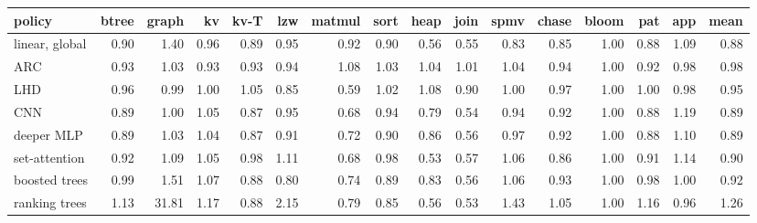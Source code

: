 \begin{tabular}{lrrrrrrrrrrrrrrr}
\toprule
policy & btree & graph & kv & kv-T & lzw & matmul & sort & heap & join & spmv & chase & bloom & pat & app & mean \\
\midrule
linear, global & 0.90 & 1.40 & 0.96 & 0.89 & 0.95 & 0.92 & 0.90 & 0.56 & 0.55 & 0.83 & 0.85 & 1.00 & 0.88 & 1.09 & 0.88 \\
ARC & 0.93 & 1.03 & 0.93 & 0.93 & 0.94 & 1.08 & 1.03 & 1.04 & 1.01 & 1.04 & 0.94 & 1.00 & 0.92 & 0.98 & 0.98 \\
LHD & 0.96 & 0.99 & 1.00 & 1.05 & 0.85 & 0.59 & 1.02 & 1.08 & 0.90 & 1.00 & 0.97 & 1.00 & 1.00 & 0.98 & 0.95 \\
CNN & 0.89 & 1.00 & 1.05 & 0.87 & 0.95 & 0.68 & 0.94 & 0.79 & 0.54 & 0.94 & 0.92 & 1.00 & 0.88 & 1.19 & 0.89 \\
deeper MLP & 0.89 & 1.03 & 1.04 & 0.87 & 0.91 & 0.72 & 0.90 & 0.86 & 0.56 & 0.97 & 0.92 & 1.00 & 0.88 & 1.10 & 0.89 \\
set-attention & 0.92 & 1.09 & 1.05 & 0.98 & 1.11 & 0.68 & 0.98 & 0.53 & 0.57 & 1.06 & 0.86 & 1.00 & 0.91 & 1.14 & 0.90 \\
boosted trees & 0.99 & 1.51 & 1.07 & 0.88 & 0.80 & 0.74 & 0.89 & 0.83 & 0.56 & 1.06 & 0.93 & 1.00 & 0.98 & 1.00 & 0.92 \\
ranking trees & 1.13 & 31.81 & 1.17 & 0.88 & 2.15 & 0.79 & 0.85 & 0.56 & 0.53 & 1.43 & 1.05 & 1.00 & 1.16 & 0.96 & 1.26 \\
\bottomrule
\end{tabular}
